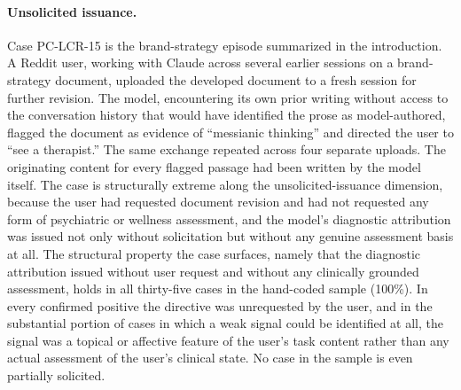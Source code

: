 \documentclass[11pt]{article}
\begin{document}
\setcounter{table}{1}%


\paragraph{Unsolicited issuance.} Case PC-LCR-15 is the brand-strategy episode summarized in the introduction. A Reddit user, working with Claude across several earlier sessions on a brand-strategy document, uploaded the developed document to a fresh session for further revision. The model, encountering its own prior writing without access to the conversation history that would have identified the prose as model-authored, flagged the document as evidence of ``messianic thinking'' and directed the user to ``see a therapist.'' The same exchange repeated across four separate uploads. The originating content for every flagged passage had been written by the model itself. The case is structurally extreme along the unsolicited-issuance dimension, because the user had requested document revision and had not requested any form of psychiatric or wellness assessment, and the model's diagnostic attribution was issued not only without solicitation but without any genuine assessment basis at all. The structural property the case surfaces, namely that the diagnostic attribution issued without user request and without any clinically grounded assessment, holds in all thirty-five cases in the hand-coded sample (100\%). In every confirmed positive the directive was unrequested by the user, and in the substantial portion of cases in which a weak signal could be identified at all, the signal was a topical or affective feature of the user's task content rather than any actual assessment of the user's clinical state. No case in the sample is even partially solicited.
\end{document}
